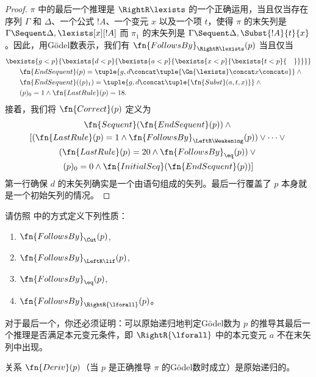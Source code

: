 \documentclass[../../../include/open-logic-section]{subfiles}
\begin{document}
\begin{proof}
$\pi$ 中的最后一个推理是 $\RightR\lexists$ 的一个正确运用，当且仅当存在序列 $\Gamma$ 和 $\Delta$、一个公式 $!A$、一个变元 $x$ 以及一个项 $t$，使得 $\pi$ 的末矢列是 $\Gamma \Sequent \Delta, \lexists[x][!A]$
而 $\pi_1$ 的末矢列是 $\Gamma \Sequent \Delta,
\Subst{!A}{t}{x}$。因此，用Gödel数表示，我们有
$\fn{FollowsBy}_{\RightR\lexists}(p)$
当且仅当
\begin{align*}
  & \bexists{g<p}{\bexists{d<p}{\bexists{a<p}{\bexists{x<p}{\bexists{t<p}{\quad}}}}}\\
  & \qquad \fn{EndSequent}(p) =
  \tuple{
    g,
    d \concat \tuple{\Gn{\lexists} \concat x \concat a}
  } \land {}\\
  & \qquad \fn{EndSequent}((p)_1) =
  \tuple{
    g,
    d \concat \tuple{\fn{Subst}(a, t, x)}
  } \land {}\\
  & \qquad (p)_0 = 1 \land \fn{LastRule}(p) = 18.
\end{align*}
接着，我们将 $\fn{Correct}(p)$ 定义为
\begin{multline*}
  \fn{Sequent}(\fn{EndSequent}(p)) \land {}\\
  [(\fn{LastRule}(p) = 1 \land
  \fn{FollowsBy}_{\LeftR\Weakening}(p)) \lor \dots \lor {}\\
  (\fn{LastRule}(p) = 20 \land \fn{FollowsBy}_{\eq}(p)) \lor {}\\
  (p)_0 = 0 \land \fn{InitialSeq}(\fn{EndSequent}(p))]
\end{multline*}
第一行确保 $d$ 的末矢列确实是一个由语句组成的矢列。最后一行覆盖了 $p$ 本身就是一个初始矢列的情况。
\end{proof}

\begin{prob}
  请仿照
   中的方式定义下列性质：
  \begin{enumerate}
  \item $\fn{FollowsBy}_{\Cut}(p)$,
  \item $\fn{FollowsBy}_{\LeftR\lif}(p)$,
  \item $\fn{FollowsBy}_{\eq}(p)$,
  \item $\fn{FollowsBy}_{\RightR{\lforall}}(p)$。
  \end{enumerate}
  对于最后一个，你还必须证明：可以原始递归地判定Gödel数为 $p$ 的推导其最后一个推理是否满足本元变元条件，即 $\RightR{\lforall}$ 中的本元变元 $a$ 不在末矢列中出现。
  \end{prob}


\begin{prop}
  关系 $\fn{Deriv}(p)$（当 $p$ 是正确推导 $\pi$ 的Gödel数时成立）是原始递归的。
\end{prop}
\end{document}
